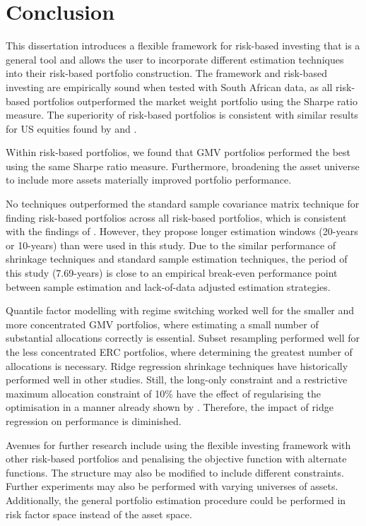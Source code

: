 \documentclass[a4paper,11pt,nocenter,bold,noupper,headcount]{mythesis}
\theoremstyle{plain}
\theoremstyle{definition}
\begin{document}
\chapter{Conclusion}

This dissertation introduces a flexible framework for risk-based investing that is a general tool and allows the user to incorporate different estimation techniques into their risk-based portfolio construction. The framework and risk-based investing are empirically sound when tested with South African data, as all risk-based portfolios outperformed the market weight portfolio using the Sharpe ratio measure. The superiority of risk-based portfolios is consistent with similar results for US equities found by \cite{DGL07} and \cite{K10}.

Within risk-based portfolios, we found that GMV portfolios performed the best using the same Sharpe ratio measure. Furthermore, broadening the asset universe to include more assets materially improved portfolio performance.

No techniques outperformed the standard sample covariance matrix technique for finding risk-based portfolios across all risk-based portfolios, which is consistent with the findings of \cite{K10}. However, they propose longer estimation windows (20-years or 10-years) than were used in this study. Due to the similar performance of shrinkage techniques and standard sample estimation techniques, the period of this study (7.69-years) is close to an empirical break-even performance point between sample estimation and lack-of-data adjusted estimation strategies. 

Quantile factor modelling with regime switching worked well for the smaller and more concentrated GMV portfolios, where estimating a small number of substantial allocations correctly is essential. Subset resampling performed well for the less concentrated ERC portfolios, where determining the greatest number of allocations is necessary. Ridge regression shrinkage techniques have historically performed well in other studies. Still, the long-only constraint and a restrictive maximum allocation constraint of 10\% have the effect of regularising the optimisation in a manner already shown by \cite{JM03}. Therefore, the impact of ridge regression on performance is diminished.

Avenues for further research include using the flexible investing framework with other risk-based portfolios and penalising the objective function with alternate functions. The structure may also be modified to include different constraints. Further experiments may also be performed with varying universes of assets. Additionally, the general portfolio estimation procedure could be performed in risk factor space instead of the asset space.
\end{document}
